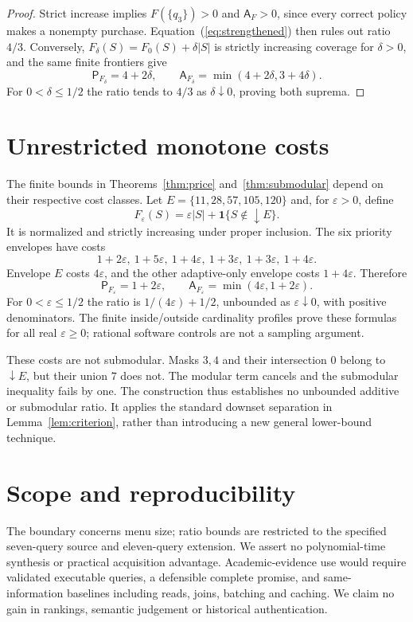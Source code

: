 \documentclass[pdflatex,sn-mathphys-num]{sn-jnl}
\newcommand{\A}{\mathsf{A}}
\newcommand{\Pcost}{\mathsf{P}}
\newcommand{\down}{\mathop{\downarrow}}
\theoremstyle{thmstyleone}
\theoremstyle{thmstylethree}
\theoremstyle{thmstyletwo}
\begin{document}
\begin{proof}
Strict increase implies $F(\{q_3\})>0$ and $\A_F>0$, since every correct policy makes a nonempty purchase. Equation~(\ref{eq:strengthened}) then rules out ratio $4/3$. Conversely, $F_\delta(S)=F_0(S)+\delta|S|$ is strictly increasing coverage for $\delta>0$, and the same finite frontiers give
\[
 \Pcost_{F_\delta}=4+2\delta,\qquad
 \A_{F_\delta}=\min(4+2\delta,3+4\delta).
\]
For $0<\delta\leq1/2$ the ratio tends to $4/3$ as $\delta\downarrow0$, proving both suprema.
\end{proof}

\section{Unrestricted monotone costs}
The finite bounds in Theorems~\ref{thm:price} and~\ref{thm:submodular} depend on their respective cost classes. Let $E=\{11,28,57,105,120\}$ and, for $\varepsilon>0$, define
\[
 F_\varepsilon(S)=\varepsilon|S|+\mathbf{1}\{S\notin\down E\}.
\]
It is normalized and strictly increasing under proper inclusion. The six priority envelopes have costs
\[
1+2\varepsilon,\ 1+5\varepsilon,\ 1+4\varepsilon,\
1+3\varepsilon,\ 1+3\varepsilon,\ 1+4\varepsilon.
\]
Envelope $E$ costs $4\varepsilon$, and the other adaptive-only envelope costs $1+4\varepsilon$. Therefore
\[
 \Pcost_{F_\varepsilon}=1+2\varepsilon,\qquad
 \A_{F_\varepsilon}=\min(4\varepsilon,1+2\varepsilon).
\]
For $0<\varepsilon\leq1/2$ the ratio is $1/(4\varepsilon)+1/2$, unbounded as $\varepsilon\downarrow0$, with positive denominators. The finite inside/outside cardinality profiles prove these formulas for all real $\varepsilon\geq0$; rational software controls are not a sampling argument.

These costs are not submodular. Masks $3,4$ and their intersection $0$ belong to $\down E$, but their union $7$ does not. The modular term cancels and the submodular inequality fails by one. The construction thus establishes no unbounded additive or submodular ratio. It applies the standard downset separation in Lemma~\ref{lem:criterion}, rather than introducing a new general lower-bound technique.

\section{Scope and reproducibility}
The boundary concerns menu size; ratio bounds are restricted to the specified seven-query source and eleven-query extension. We assert no polynomial-time synthesis or practical acquisition advantage. Academic-evidence use would require validated executable queries, a defensible complete promise, and same-information baselines including reads, joins, batching and caching. We claim no gain in rankings, semantic judgement or historical authentication.
\end{document}
